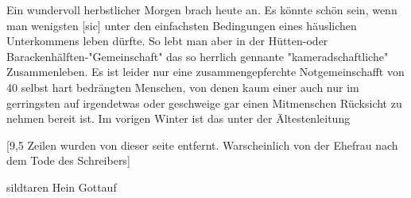 \def\day{2. Oktober 1942. *}
\mktitle

Ein wundervoll herbstlicher Morgen brach heute an.
Es k\"{o}nnte sch\"{o}n sein, wenn man wenigsten{\color{red} [sic] } unter den einfachsten Bedingungen eines h\"{a}uslichen Unterkommens leben d\"{u}rfte.
So lebt man aber in der H\"{u}tten-oder Barackenh\"{a}lften-"Gemeinschaft" das so herrlich gennante "kameradschaftliche" Zusammenleben.
Es ist leider nur eine zusammengepferchte Notgemeinschafft von 40 selbst hart bedr\"{a}ngten Menschen, von denen kaum einer auch nur im gerringsten auf irgendetwas oder geschweige gar einen Mitmenschen R\"{u}cksicht zu nehmen bereit ist.
Im vorigen Winter ist das unter der \"{A}ltestenleitung

{\color{red} [9,5 Zeilen wurden von dieser seite entfernt. Warscheinlich von der Ehefrau nach dem Tode des Schreibers] }

sildtaren Hein Gottauf

\clearpage
